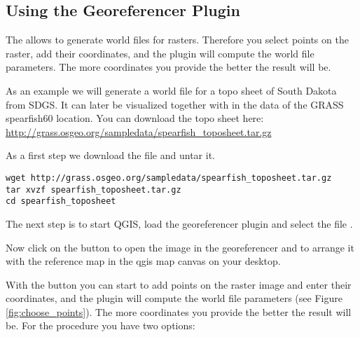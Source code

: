 \subsection{Using the Georeferencer Plugin}

The  allows to generate world files for rasters.
Therefore you select points on the raster, add their coordinates, and the plugin will compute the world file parameters.
The more coordinates you provide the better the result will be.

As an example we will generate a world file for a topo sheet of South Dakota from SDGS.
It can later be visualized together with in the data of the GRASS spearfish60 location.
You can download the topo sheet here: \url{http://grass.osgeo.org/sampledata/spearfish\_toposheet.tar.gz}

As a first step we download the file and untar it.

\begin{verbatim}
wget http://grass.osgeo.org/sampledata/spearfish_toposheet.tar.gz
tar xvzf spearfish_toposheet.tar.gz
cd spearfish_toposheet
\end{verbatim}

The next step is to start QGIS, load the georeferencer plugin and select the file .


Now click on the button  to open the image in the georeferencer and to arrange it with the reference map in the qgis map canvas on your desktop.


With the button  you can start to add points on the raster image and enter their coordinates, and the plugin will compute the world file parameters (see Figure \ref{fig:choose_points}).
The more coordinates you provide the better the result will be.
For the procedure you have two options:

